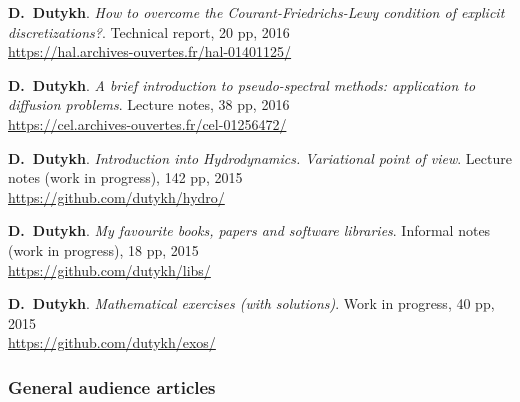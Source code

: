 \begin{etaremune}

  \item \textbf{D.~Dutykh}. \textit{How to overcome the Courant-Friedrichs-Lewy condition of explicit discretizations?}. Technical report, 20 pp, 2016 \\ %
  \url{https://hal.archives-ouvertes.fr/hal-01401125/}
  
  \item \textbf{D.~Dutykh}. \textit{A brief introduction to pseudo-spectral methods: application to diffusion problems}. Lecture notes, 38 pp, 2016 \\ %
  \url{https://cel.archives-ouvertes.fr/cel-01256472/}
  
  \item \textbf{D.~Dutykh}. \textit{Introduction into Hydrodynamics. Variational point of view}. Lecture notes (work in progress), 142 pp, 2015 \\ %
  \url{https://github.com/dutykh/hydro/}
  
  \item \textbf{D.~Dutykh}. \textit{My favourite books, papers and software libraries}. Informal notes (work in progress), 18 pp, 2015 \\ %
  \url{https://github.com/dutykh/libs/}
  
  \item \textbf{D.~Dutykh}. \textit{Mathematical exercises (with solutions)}. Work in progress, 40 pp, 2015 \\ %
  \url{https://github.com/dutykh/exos/}
  
\end{etaremune}

\separator
\subsubsection{General audience articles}

